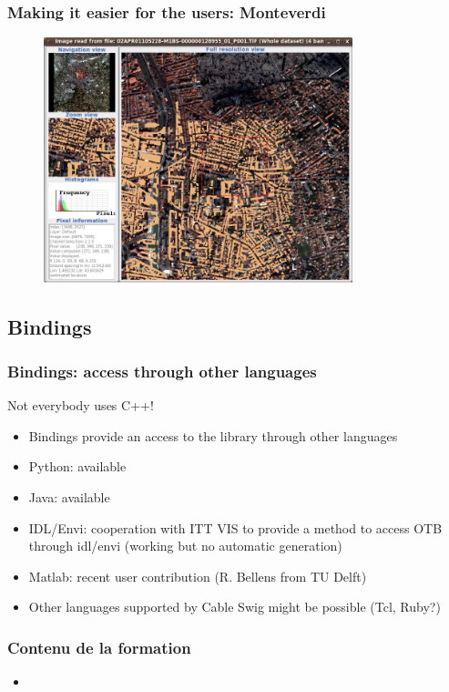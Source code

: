 \documentclass[compress]{beamer}
\begin{document}
\begin{frame}
\frametitle{Making it easier for the users: Monteverdi}
\begin{figure}[]
  \includegraphics[width=0.8\textwidth]{monteverdi2.jpg}
\end{figure}
\end{frame}

\subsection{Bindings}
\begin{frame}
\frametitle{Bindings: access through other languages}
\begin{block}{Not everybody uses C++!}
\scriptsize
\begin{itemize}
\item Bindings provide an access to the library through other languages
\item \alert{Python}: available
\item \alert{Java}: available
\item \alert{IDL/Envi}: cooperation with ITT VIS to provide a method
  to access OTB through idl/envi (working but no automatic generation)
  \item \alert{Matlab}: recent user contribution (R. Bellens from TU Delft)
\item Other languages supported by Cable Swig might be possible (Tcl, Ruby?)
\end{itemize}
\end{block}
\end{frame}

\begin{frame}
  \frametitle{Contenu de la formation}
  \begin{itemize}
  \item 
  \end{itemize}
\end{frame}
\end{document}
